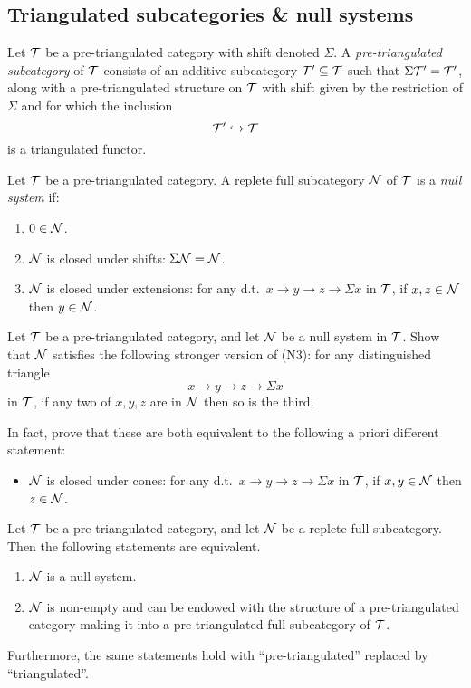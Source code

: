 \subsection{Triangulated subcategories \& null systems}
\begin{definition}
	Let \(\mathcal{T}\) be a pre-triangulated category with shift denoted \(\Sigma\). A \emph{pre-triangulated subcategory} of \(\mathcal{T}\) consists of an additive subcategory \(\mathcal{T}'\subseteq\mathcal{T}\)
	such that \(\Sigma\mathcal{T}' = \mathcal{T}'\), along with a pre-triangulated structure on \(\mathcal{T}\) with shift given by the restriction of \(\Sigma\) and for which the inclusion
	\[ \mathcal{T}'\hookrightarrow\mathcal{T} \]
	is a triangulated functor.
\end{definition}
\begin{definition}
	Let \(\mathcal{T}\) be a pre-triangulated category. A replete full subcategory \(\mathcal{N}\) of \(\mathcal{T}\) is a \emph{null system} if:
	\begin{enumerate}[label=(N\arabic*)]
	\item \(0\in \mathcal{N}\).
	\item \(\mathcal{N}\) is closed under shifts: \(\Sigma\mathcal{N} = \mathcal{N}\).
	\item \(\mathcal{N}\) is closed under extensions: for any d.t.\ \(x\to y\to z \to \Sigma x\) in \(\mathcal{T}\), if \(x,z\in\mathcal{N}\) then \(y\in\mathcal{N}\).
	\end{enumerate}
\end{definition}
\begin{exercise}\label{exercise:null-system-N3}
	Let \(\mathcal{T}\) be a pre-triangulated category, and let \(\mathcal{N}\) be a null system in \(\mathcal{T}\). Show that \(\mathcal{N}\) satisfies the following stronger version of (N3): for any
	distinguished triangle
	\[ x\to y \to z\to \Sigma x \]
	in \(\mathcal{T}\), if any two of \(x,y,z\) are in \(\mathcal{N}\) then so is the third.

	In fact, prove that these are both equivalent to the following a priori different statement:
	\begin{itemize}[label=(N3')]
	\item \(\mathcal{N}\) is closed under cones: for any d.t.\ \(x\to y\to z\to \Sigma x\) in \(\mathcal{T}\), if \(x,y\in\mathcal{N}\) then \(z\in\mathcal{N}\).
	\end{itemize}
\end{exercise}
\begin{proposition}\label{prop:null-system-subcategory-characterization}
	Let \(\mathcal{T}\) be a pre-triangulated category, and let \(\mathcal{N}\) be a replete full subcategory. Then the following statements are equivalent.
	\begin{enumerate}
	\item \(\mathcal{N}\) is a null system.
	\item \(\mathcal{N}\) is non-empty and can be endowed with the structure of a pre-triangulated category making it into a pre-triangulated full subcategory of \(\mathcal{T}\).
	\end{enumerate}
	Furthermore, the same statements hold with ``pre-triangulated'' replaced by ``triangulated''.
\end{proposition}
